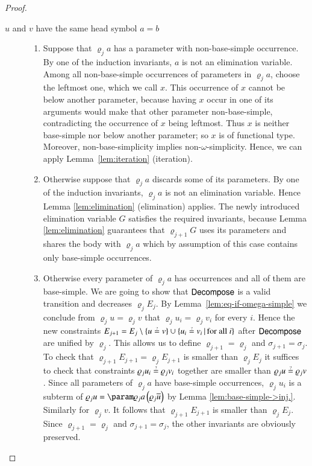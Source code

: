 \begin{proof}
    \begin{description}
    \item[$u$ and $v$ have the same head symbol $a=b$] \hfill
    \begin{enumerate}[beginpenalty=1000]
    \item Suppose that $\varrho_{j}a$ has a parameter with non-base-simple
    occurrence. By one of the induction invariants, $a$ is not an elimination
    variable. 
    Among all non-base-simple occurrences of parameters in $\varrho_{j}a$, 
    choose the leftmost one, which we call $x$.
    This occurrence of $x$ cannot be below another parameter, 
    because having $x$ occur in one of its arguments would make
    that other parameter non-base-simple, contradicting the occurrence of $x$ being leftmost.
    Thus $x$ is neither base-simple nor below another parameter; so $x$ is of functional type.
    Moreover, non-base-simplicity implies non-$\omega$-simplicity.
    Hence, we can apply Lemma~\ref{lem:iteration} (iteration).

    \item Otherwise suppose that $\varrho_{j}a$ discards some of its parameters.
    By one of the induction invariants, $\varrho_{j}a$ is not an elimination variable.
    Hence Lemma \ref{lem:elimination} (elimination) applies. The newly introduced elimination
    variable $G$ satisfies the required invariants, because Lemma \ref{lem:elimination}
    guarantees that $\varrho_{j+1}G$ uses its parameters and shares the
    body with $\varrho_{j}a$ which by assumption of this case contains
    only base-simple occurrences.

    \item Otherwise every parameter of $\varrho_{j}a$ has occurrences and
    all of them are base-simple. We are going to show that $\textsf{Decompose}$
    is a valid transition and decreases $\varrho_{j}E_{j}$. By Lemma~\ref{lem:eq-if-omega-simple}
    we conclude from $\varrho_{j}u=\varrho_{j}v$ that $\varrho_{j}u_{i}=\varrho_{j}v_{i}$
    for every $i$. Hence the new constraints 
    $E_{j+1}=E_{j}\setminus\left\{ u\unif v\right\} \cup\set{u_{i}\unif v_{i}}{\text{for all }i}$
    after $\textsf{Decompose}$ are unified by $\varrho_{j}$.
    This allows us to define $\varrho_{j+1}=\varrho_{j}$ and
    $\sigma_{j+1}=\sigma_{j}$.
    To check that $\varrho_{j+1}E_{j+1}=\varrho_{j}E_{j+1}$ is smaller
    than $\varrho_{j}E_{j}$ it suffices to check that constraints $\varrho_{j}u_{i}\unif\varrho_{j}v_{i}$
    together are smaller than $\varrho_{j}u\unif\varrho_{j}v$. Since
    all parameters of $\varrho_{j}a$ have base-simple occurrences, $\varrho_{j}u_{i}$
    is a subterm of $\varrho_{j}u=\param\varrho_{j}a\,\left(\varrho_{j}\seq u\right)$
    by Lemma \ref{lem:base-simple->inj.}. Similarly for $\varrho_{j}v$.
    It follows that $\varrho_{j+1}E_{j+1}$ is smaller
    than $\varrho_{j}E_{j}$.
    Since $\varrho_{j+1}=\varrho_{j}$ and
    $\sigma_{j+1}=\sigma_{j}$, the other
    invariants are obviously preserved.


\end{enumerate}
\end{description}
\end{proof}
